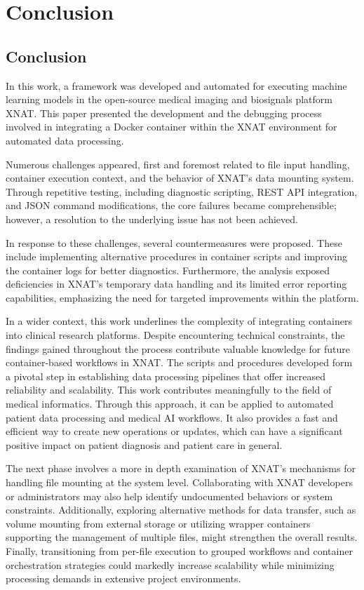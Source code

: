 

\chapter{Conclusion}

\section{Conclusion}
In this work, a framework was developed and automated for executing machine learning models in the open-source medical imaging and biosignals platform XNAT. This paper presented the development and the debugging process involved in integrating a Docker container within the XNAT environment for automated data processing.

Numerous challenges appeared, first and foremost related to file input handling, container execution context, and the behavior of XNAT's data mounting system. Through repetitive testing, including diagnostic scripting, REST API integration, and JSON command modifications, the core failures became comprehensible; however, a resolution to the underlying issue has not been achieved.

In response to these challenges, several countermeasures were proposed. These include implementing alternative procedures in container scripts and improving the container logs for better diagnostics. Furthermore, the analysis exposed deficiencies in XNAT’s temporary data handling and its limited error reporting capabilities, emphasizing the need for targeted improvements within the platform.

In a wider context, this work underlines the complexity of integrating containers into clinical research platforms. Despite encountering technical constraints, the findings gained throughout the process contribute valuable knowledge for future container-based workflows in XNAT. The scripts and procedures developed form a pivotal step in establishing data processing pipelines that offer increased reliability and scalability. This work contributes meaningfully to the field of medical informatics. Through this approach, it can be applied to automated patient data processing and medical AI workflows. It also provides a fast and efficient way to create new operations or updates, which can have a significant positive impact on patient diagnosis and patient care in general.

The next phase involves a more in depth examination of XNAT's mechanisms for handling file mounting at the system level. Collaborating with XNAT developers or administrators may also help identify undocumented behaviors or system constraints. Additionally, exploring alternative methods for data transfer, such as volume mounting from external storage or utilizing wrapper containers supporting the management of multiple files, might strengthen the overall results. Finally, transitioning from per-file execution to grouped workflows and container orchestration strategies could markedly increase scalability while minimizing processing demands in extensive project environments. 

